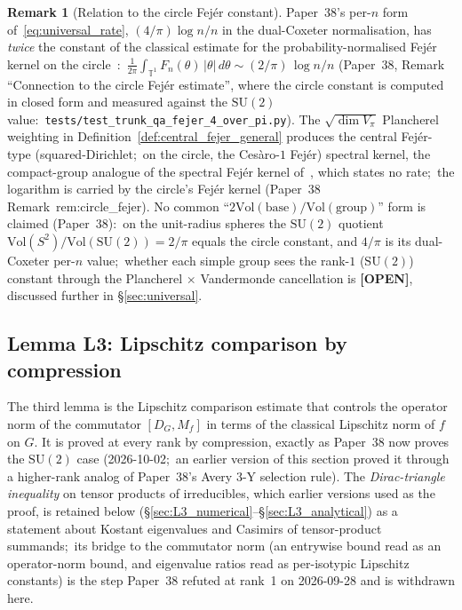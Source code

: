 \documentclass[11pt,a4paper]{article}
\theoremstyle{plain}
\theoremstyle{definition}
\newtheorem{remark}[theorem]{Remark}
\newcommand{\T}{\mathbb{T}}
\newcommand{\SU}{\mathrm{SU}}
\newcommand{\Vol}{\mathrm{Vol}}
\newcommand{\Dop}{D}
\begin{document}
\begin{remark}[Relation to the circle Fej\'er constant]
\label{rem:stein_weiss_general}
Paper~38's per-$n$ form of~\eqref{eq:universal_rate}, $(4/\pi)\log n/n$
in the dual-Coxeter normalisation, has \emph{twice} the
constant of the classical estimate for the probability-normalised
Fej\'er kernel on the circle~\cite{zygmund2002}:\
$\frac{1}{2\pi}\int_{\T^1} F_n(\theta)\,|\theta|\,d\theta \sim
(2/\pi)\,\log n / n$ (Paper~38, Remark ``Connection to the circle
Fej\'er estimate'', where the circle constant is computed in closed
form and measured against the $\SU(2)$ value:\
\texttt{tests/test\_trunk\_qa\_fejer\_4\_over\_pi.py}). The
$\sqrt{\dim V_\pi}$ Plancherel weighting in
Definition~\ref{def:central_fejer_general} produces the central
Fej\'er-type (squared-Dirichlet;\ on the circle, the Ces\`aro-$1$
Fej\'er) spectral kernel, the
compact-group analogue of the spectral Fej\'er kernel
of~\cite{leimbach_vs2024}, which states no rate;\ the logarithm is
carried by the circle's Fej\'er kernel (Paper~38
Remark~rem:circle\_fejer).  No common
``$2\Vol(\text{base})/\Vol(\text{group})$'' form is claimed (Paper~38):\
on the unit-radius spheres the $\SU(2)$ quotient
$\Vol(S^2)/\Vol(\SU(2)) = 2/\pi$ equals the circle constant, and $4/\pi$
is its dual-Coxeter per-$n$ value;\ whether each simple group sees the
rank-$1$ ($\SU(2)$) constant through the Plancherel $\times$ Vandermonde
cancellation is \textbf{[OPEN]}, discussed further in
\S\ref{sec:universal}.
\end{remark}

\subsection{Lemma L3: Lipschitz comparison by compression}\label{sec:L3}

The third lemma is the Lipschitz comparison estimate that controls the
operator norm of the commutator $[\Dop_G, M_f]$ in terms of the
classical Lipschitz norm of $f$ on $G$. It is proved at every rank by
compression, exactly as Paper~38 now proves the $\SU(2)$ case
(2026-10-02;\ an earlier version of this section proved it through a
higher-rank analog of Paper~38's Avery 3-Y selection rule).  The
\emph{Dirac-triangle inequality} on tensor products of irreducibles,
which earlier versions used as the proof, is retained below
(\S\ref{sec:L3_numerical}--\S\ref{sec:L3_analytical}) as a statement
about Kostant eigenvalues and Casimirs of tensor-product summands;\
its bridge to the commutator norm (an entrywise bound read as an
operator-norm bound, and eigenvalue ratios read as per-isotypic
Lipschitz constants) is the step Paper~38 refuted at rank~1 on
2026-09-28 and is withdrawn here.
\end{document}

